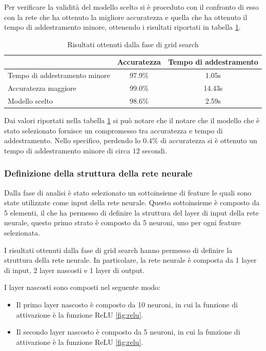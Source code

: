 Per verificare la validità del modello scelto si è proceduto con il confronto di
esso con la rete che ha ottenuto la migliore accuratezza e quella che ha ottenuto
il tempo di addestramento minore, ottenendo i risultati riportati in tabella \ref{tab:ris-grid-search}.
\begin{table}[ht]
    \centering
    \begin{tabular}{@{}lcc@{}}
        \toprule
        \rowcolor[HTML]{EFEFEF}
        \multicolumn{1}{c}{\cellcolor[HTML]{EFEFEF}\textbf{Modello}} & \textbf{Accuratezza} & \textbf{Tempo di addestramento} \\ \midrule
        Tempo di addestramento minore                                & 97.9\%               & 1.05s                           \\
        Accuratezza maggiore                                         & 99.0\%               & 14.43s                          \\
        Modello scelto                                               & 98.6\%               & 2.59s                           \\ \bottomrule
    \end{tabular}
    \caption{Risultati ottenuti dalla fase di grid search}
    \label{tab:ris-grid-search}
\end{table}

Dai valori riportati nella tabella \ref{tab:ris-grid-search} si può notare che il
notare che il modello che è stato selezionato fornisce un compromesso tra
accuratezza e tempo di addestramento. Nello specifico, perdendo lo $0.4\%$ di
accuratezza si è ottenuto un tempo di addestramento minore di circa $12$ secondi.
\subsubsection{Definizione della struttura della rete neurale}
Dalla fase di analisi è stato selezionato un sottoinsieme di feature le quali
sono state utilizzate come input della rete neurale. Questo sottoinsieme è
composto da 5 elementi, il che ha permesso di definire la struttura del layer di
input della rete neurale, questo primo strato è composto da 5 neuroni, uno per
ogni feature selezionata.

I risultati ottenuti dalla fase di grid search hanno permesso di definire la
struttura della rete neurale. In particolare, la rete neurale è composta da 1
layer di input, 2 layer nascosti e 1 layer di output.

I layer nascosti sono composti nel seguente modo:
\begin{itemize}
    \item Il primo layer nascosto è composto da 10 neuroni, in cui la funzione di
          attivazione è la funzione ReLU \ref{fig:relu}.
    \item Il secondo layer nascosto è composto da 5 neuroni, in cui la funzione
          di attivazione è la funzione ReLU \ref{fig:relu}.
\end{itemize}

